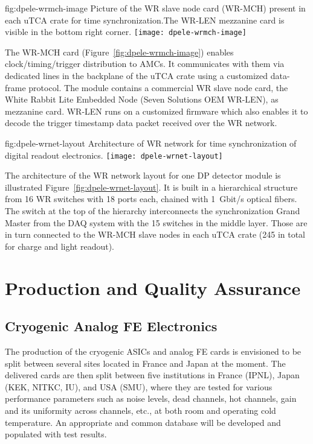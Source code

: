 \begin{dunefigure}{fig:dpele-wrmch-image}
{Picture of the WR slave node card (WR-MCH) present in each uTCA crate for time synchronization.The WR-LEN mezzanine card is visible in the bottom right corner.}
\texttt{[image: dpele-wrmch-image]}
\end{dunefigure}

The WR-MCH card (Figure~\ref{fig:dpele-wrmch-image}) enables clock/timing/trigger distribution to AMCs. It communicates with them via dedicated lines in the backplane of the uTCA crate using a customized data-frame protocol. The module contains a commercial WR slave node card, the White Rabbit Lite Embedded Node (Seven Solutions OEM WR-LEN), as mezzanine card. WR-LEN runs on a customized firmware which also enables it to decode the trigger timestamp data packet received over the WR network.

\begin{dunefigure}{fig:dpele-wrnet-layout}
{Architecture of WR network for time synchronization of digital readout electronics.}
\texttt{[image: dpele-wrnet-layout]}
\end{dunefigure}

The architecture of the WR network layout for one DP detector module is illustrated Figure~\ref{fig:dpele-wrnet-layout}. It is built in a hierarchical structure from \num{16} WR switches with \num{18} ports each,  chained with \SI{1}{Gbit/s} optical fibers. The switch at the top of the hierarchy interconnects the synchronization Grand Master from the DAQ system with the \num{15} switches in the middle layer. Those are in turn connected to the WR-MCH slave nodes in each uTCA crate (245 in total for charge and light readout). 



\section{Production and Quality Assurance}
\label{sec:fddp-tpc-elec-prod-assy}

\subsection{Cryogenic Analog FE Electronics}
\label{sec:fddp-tpc-elec-prod-fe}
The production of the cryogenic ASICs and analog FE cards is envisioned to be split between several sites located in France and Japan at the moment. The delivered cards are then split between five institutions in France (IPNL), Japan (KEK, NITKC, IU), and USA (SMU), where they are tested for various performance parameters such as noise levels, dead channels, hot channels, gain and its uniformity across channels, etc., at both room and operating cold temperature. An appropriate and common database will be developed and populated with test results. 

